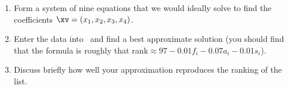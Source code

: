 \begin{exercise}
\begin{enumerate}
\item Form a system of nine equations that we would ideally solve to find the coefficients \(\xv=(x_1,x_2,x_3,x_4)\).
\setbox\ajrqrbox\hbox{}%
\marginajrbox%
\item Enter the data into \script\ and find a best approximate solution (you should find that the formula is roughly that rank\({}\approx 97-0.01f_i-0.07a_i-0.01s_i\)).
\item Discuss briefly how well your approximation reproduces the ranking of the list.
\end{enumerate}
\end{exercise}





\begin{comment}
Might be nice to show \(1/f\) structure of music, Voss \& Clark.  However, probably too data hungry, and too hard to explain the Fourier transform to the power spectrum.  
Could it be done after orthogonal diagonalization?

Exercises involving higher-D inference.
\end{comment}





